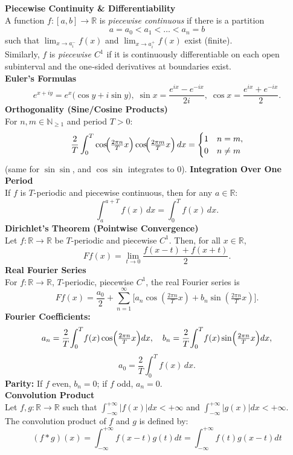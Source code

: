 \documentclass[8pt]{article}
\begin{document}
\begin{multicols}{2}
    \noindent \textbf{Piecewise Continuity \& Differentiability}\\
    A function $f:[a,b]\to\mathbb{R}$ is \emph{piecewise continuous} if there is a partition
    \[ a=a_0 < a_1 < \dots < a_n = b \]
    such that $\lim_{x \to a_i^-} f(x)$ and $\lim_{x \to a_i^+} f(x)$ exist (finite).\\
    Similarly, $f$ is \emph{piecewise $C^1$} if it is continuously differentiable on each open subinterval and the one‐sided derivatives at boundaries exist. \\
    \noindent \textbf{Euler's Formulas}
    \[
    e^{x+iy} = e^{x}\bigl(\cos y + i \sin y\bigr),\;
    \sin x = \frac{e^{ix}-e^{-ix}}{2i},\;
    \cos x = \frac{e^{ix}+e^{-ix}}{2}.
    \]
    \noindent \textbf{Orthogonality (Sine/Cosine Products)}\\
    For $n,m \in \mathbb{N}_{\ge 1}$ and period $T>0$:
    \[
    \frac{2}{T} \int_{0}^{T}
    \cos\!\Bigl(\tfrac{2\pi n}{T}x\Bigr)\cos\!\Bigl(\tfrac{2\pi m}{T}x\Bigr)\,dx
    =
    \begin{cases}
    1 & n=m,\\
    0 & n\neq m
    \end{cases}
    \]
    (same for $\sin\sin$, and $\cos\sin$ integrates to $0$).
    \noindent \textbf{Integration Over One Period}\\
    If $f$ is $T$-periodic and piecewise continuous, then for any $a\in\mathbb{R}$:
    \[
    \int_{a}^{a+T} f(x)\,dx = \int_{0}^{T} f(x)\,dx.
    \]
    \noindent \textbf{Dirichlet's Theorem (Pointwise Convergence)}\\
    Let \( f : \mathbb{R} \to \mathbb{R} \) be \( T \)-periodic and piecewise \( C^1 \). Then, for all \( x \in \mathbb{R} \),
    \[
    Ff(x) = \lim_{t \to 0} \frac{f(x - t) + f(x + t)}{2}.
    \]
    \noindent \textbf{Real Fourier Series}\\
    For $f:\mathbb{R}\to\mathbb{R}$, $T$-periodic, piecewise $C^1$, the real Fourier series is
    \[
    Ff(x)= \frac{a_{0}}{2} + \sum_{n=1}^{\infty}\!\bigl[a_{n}\cos(\tfrac{2\pi n}{T}x)+b_{n}\sin(\tfrac{2\pi n}{T}x)\bigr].
    \]
    \noindent \textbf{Fourier Coefficients:} \\
    \[
    a_{n} = \frac{2}{T}\!\int_{0}^{T}\!f(x)\cos\Bigl(\tfrac{2\pi n}{T}x\Bigr)dx,\quad
    b_{n} = \frac{2}{T}\!\int_{0}^{T}\!f(x)\sin\Bigl(\tfrac{2\pi n}{T}x\Bigr)dx,
    \]
    \[
    a_{0} = \frac{2}{T}\int_{0}^{T} f(x)\,dx.
    \]
    \noindent \textbf{Parity:} If $f$ even, $b_{n}=0$; if $f$ odd, $a_{n}=0$.\\
    \noindent \textbf{Convolution Product}\\
    Let \(f, g : \mathbb{R} \to \mathbb{R}\) such that \(\int_{-\infty}^{+\infty} |f(x)| dx < +\infty\) and \(\int_{-\infty}^{+\infty} |g(x)| dx < +\infty\).\\ The convolution product of \(f\) and \(g\) is defined by:
    \[
    (f * g)(x) = \int_{-\infty}^{+\infty} f(x - t) g(t) dt = \int_{-\infty}^{+\infty} f(t) g(x - t) dt
    \]
    \columnbreak


\end{multicols}
\end{document}

